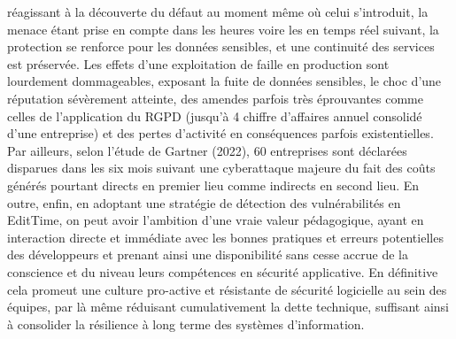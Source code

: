 réagissant à la découverte du défaut au moment même où celui s’introduit, la menace étant
prise en compte dans les heures voire les en temps réel suivant, la protection se renforce
pour les données sensibles, et une continuité des services est préservée.
Les effets d’une exploitation de faille en production sont lourdement dommageables,
exposant la fuite de données sensibles, le choc d’une réputation sévèrement atteinte, des
amendes parfois très éprouvantes comme celles de l’application du RGPD (jusqu’à 4%
chiffre d’affaires annuel consolidé d’une entreprise) et des pertes d’activité en conséquences
parfois existentielles. Par ailleurs, selon l’étude de Gartner (2022), 60%
entreprises sont déclarées disparues dans les six mois suivant une cyberattaque majeure du
fait des coûts générés pourtant directs en premier lieu comme indirects en second lieu.
En outre, enfin, en adoptant une stratégie de détection des vulnérabilités en EditTime, on
peut avoir l’ambition d’une vraie valeur pédagogique, ayant en interaction directe et
immédiate avec les bonnes pratiques et erreurs potentielles des développeurs et prenant
ainsi une disponibilité sans cesse accrue de la conscience et du niveau leurs compétences
en sécurité applicative. En définitive cela promeut une culture pro-active et résistante de sécurité logicielle au sein des équipes, par là même réduisant cumulativement la dette
technique, suffisant ainsi à consolider la résilience à long terme des systèmes d’information.
